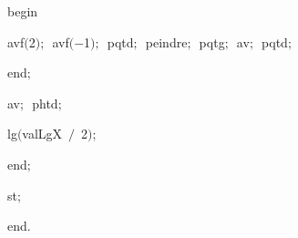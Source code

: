 {\vspace{\neglskip}\mbox{\blc  \blk\blk\blk\blk\idt  \mcl begin\idt }\par 
\vspace{\neglskip}\mbox{\blc  \blk\blk\blk\blk\blk\idt  avf$($2$)$$;$\ avf$($$-$1$)$$;$\ pqtd$;$\ peindre$;$\ pqtg$;$\ av$;$\ pqtd$;$\ }\par 
\vspace{\neglskip}\mbox{\blc  \blk\blk\blk\blk\idt  \mcl end\idt $;$}\par 
\vspace{\neglskip}\mbox{\blc  \blk\blk\blk\idt  av$;$\ phtd$;$\ }\par 
\vspace{\neglskip}\mbox{\blc  \blk\blk\blk\idt  lg$($valLgX\ $/$\ 2$)$$;$}\par 
\vspace{\neglskip}\mbox{\blc  \blk\blk\idt  \mcl end\idt $;$}\par 
\vspace{\neglskip}\mbox{\blc  \blk\idt  st$;$}\par 
\vspace{\neglskip}\mbox{\blc  \idt  \mcl end\idt $.$}\par 

\medskip }

